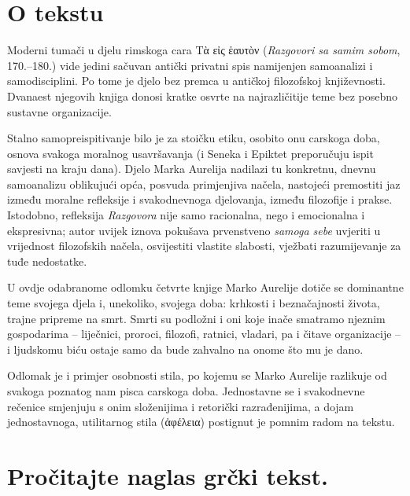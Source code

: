

\section*{O tekstu}

Moderni tumači u djelu rimskoga cara \textgreek[variant=ancient]{Tὰ εἰς ἑαυτὸν} (\textit{Razgovori sa samim sobom}, 170.–180.) vide jedini sačuvan antički privatni spis namijenjen samoanalizi i samodisciplini. Po tome je djelo bez premca u antičkoj filozofskoj književnosti. Dvanaest njegovih knjiga donosi kratke osvrte na najrazličitije teme bez posebno sustavne organizacije.

Stalno samopreispitivanje bilo je za stoičku etiku, osobito onu carskoga doba, osnova svakoga moralnog usavršavanja (i Seneka i Epiktet preporučuju ispit savjesti na kraju dana). Djelo Marka Aurelija nadilazi tu konkretnu, dnevnu samoanalizu oblikujući opća, posvuda primjenjiva načela, nastojeći premostiti jaz između moralne refleksije i svakodnevnoga djelovanja, između filozofije i prakse. Istodobno, refleksija \textit{Razgovora} nije samo racionalna, nego i emocionalna i ekspresivna; autor uvijek iznova pokušava prvenstveno \textit{samoga sebe} uvjeriti u vrijednost filozofskih načela, osvijestiti vlastite slabosti, vježbati razumijevanje za tuđe nedostatke.

U ovdje odabranome odlomku četvrte knjige Marko Aurelije dotiče se dominantne teme svojega djela i, unekoliko, svojega doba: krhkosti i beznačajnosti života, trajne pripreme na smrt. Smrti su podložni i oni koje inače smatramo njeznim gospodarima – liječnici, proroci, filozofi, ratnici, vladari, pa i čitave organizacije – i ljudskomu biću ostaje samo da bude zahvalno na onome što mu je dano.

Odlomak je i primjer osobnosti stila, po kojemu se Marko Aurelije razlikuje od svakoga poznatog nam pisca carskoga doba. Jednostavne se i svakodnevne rečenice smjenjuju s onim složenijima i retorički razrađenijima, a dojam jednostavnoga, utilitarnog stila (\textgreek[variant=ancient]{ἀφέλεια}) postignut je pomnim radom na tekstu.


\section*{Pročitajte naglas grčki tekst.}

